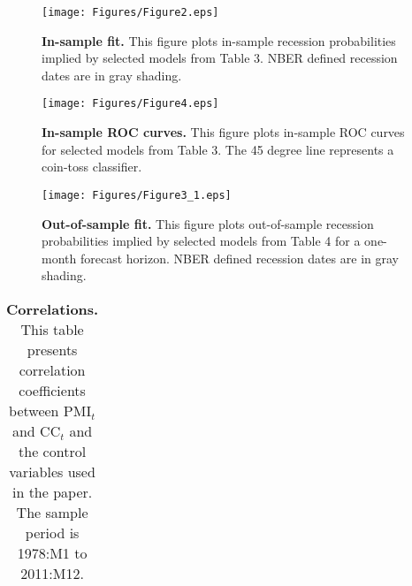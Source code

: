 \documentclass[12pt,a4paper,onecolumn,oneside,notitlepage]{article}
\begin{document}
\clearpage
\begin{figure}[htbp]
    \caption{
        \textbf{In-sample fit.} \newline 
        This figure plots in-sample recession probabilities implied by selected models from Table 3. NBER defined recession dates are in gray shading.
    }
    \centering
    \texttt{[image: Figures/Figure2.eps]} 
     \label{fig:isfit}
\end{figure}

\clearpage
\begin{figure}[htbp]
    \caption{
        \textbf{In-sample ROC curves.} \newline 
        This figure plots in-sample ROC curves for selected models from Table 3. The 45 degree line represents a coin-toss classifier.
    }
    \centering
    \texttt{[image: Figures/Figure4.eps]} 
    \label{fig:isroc}
\end{figure}

\clearpage
\begin{figure}[htbp]
    \caption{
        \textbf{Out-of-sample fit.} \newline 
        This figure plots out-of-sample recession probabilities implied by selected models from Table 4 for a one-month forecast horizon. NBER defined recession dates are in gray shading.
    }
    \centering
    \texttt{[image: Figures/Figure3\_1.eps]} 
    \label{fig:oosfit}
\end{figure}


\clearpage
\begin{table}[htbp]
    \centering
    \footnotesize
    \caption{
        \textbf{Correlations.} \newline 
        This table presents correlation coefficients between PMI$_{t}$ and CC$_{t}$ and the control variables used in the paper. The sample period is 1978:M1 to 2011:M12.
    }
    \begin{tabularx}{\textwidth}{YZZZZZZZ}
        \toprule
        
        \bottomrule
    \end{tabularx}
    \label{tab:cormat}
\end{table}
\end{document}
